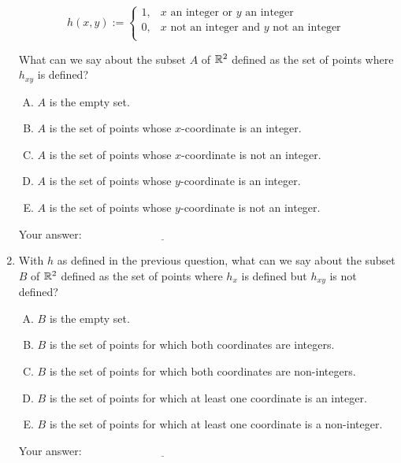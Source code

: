 \documentclass[10pt]{amsart}
\begin{document}
\begin{enumerate}
  $$h(x,y) := \left\lbrace \begin{array}{rl} 1, & x \text{ an integer or } y \text{ an integer }\\0, & x \text{ not an integer and } y \text{ not an integer } \\\end{array}\right.$$

  What can we say about the subset $A$ of $\mathbb{R}^2$ defined as the set of
  points where $h_{xy}$ is defined?

  \begin{enumerate}[(A)]
  \item $A$ is the empty set.
  \item $A$ is the set of points whose $x$-coordinate is an integer.
  \item $A$ is the set of points whose $x$-coordinate is not an integer.
  \item $A$ is the set of points whose $y$-coordinate is an integer.
  \item $A$ is the set of points whose $y$-coordinate is not an integer.
  \end{enumerate}

  \vspace{0.05in}
  Your answer: $\underline{\qquad\qquad\qquad\qquad\qquad\qquad\qquad}$
  \vspace{0.05in}

\item With $h$ as defined in the previous question, what can we say
  about the subset $B$ of $\mathbb{R}^2$ defined as the set of points where
  $h_x$ is defined but $h_{xy}$ is not defined?

  \begin{enumerate}[(A)]
  \item $B$ is the empty set.
  \item $B$ is the set of points for which both coordinates are integers.
  \item $B$ is the set of points for which both coordinates are non-integers.
  \item $B$ is the set of points for which at least one coordinate is an integer.
  \item $B$ is the set of points for which at least one coordinate is
    a non-integer.
  \end{enumerate}

  \vspace{0.05in}
  Your answer: $\underline{\qquad\qquad\qquad\qquad\qquad\qquad\qquad}$
  \vspace{0.05in}


\end{enumerate}
\end{document}

